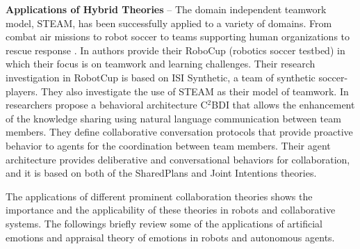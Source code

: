 \textbf{Applications of Hybrid Theories} -- The domain independent teamwork
model, STEAM, has been successfully applied to a variety of domains.  From
combat air missions \cite{hill:synthetic-battlefield-aircraft} to robot soccer
\cite{kitano:robocup} to teams supporting human organizations
\cite{pynadath:teamwork-heterogeneous-agents} to rescue response
\cite{scerri:robot-agent-person}. In \cite{marsella:robocup} authors provide
their RoboCup (robotics soccer testbed) in which their focus is on teamwork and
learning challenges. Their research investigation in RobotCup is based on ISI
Synthetic, a team of synthetic soccer-players. They also investigate the use of
STEAM as their model of teamwork. In \cite{kabil:coordination-mechanisms}
researchers propose a behavioral architecture C$^2$BDI that allows the
enhancement of the knowledge sharing using natural language communication
between team members. They define collaborative conversation protocols that
provide proactive behavior to agents for the coordination between team members.
Their agent architecture provides deliberative and conversational behaviors for
collaboration, and it is based on both of the SharedPlans and Joint Intentions
theories.

The applications of different prominent collaboration theories shows the
importance and the applicability of these theories in robots and collaborative
systems. The followings briefly review some of the applications of artificial
emotions and appraisal theory of emotions in robots and autonomous agents.

